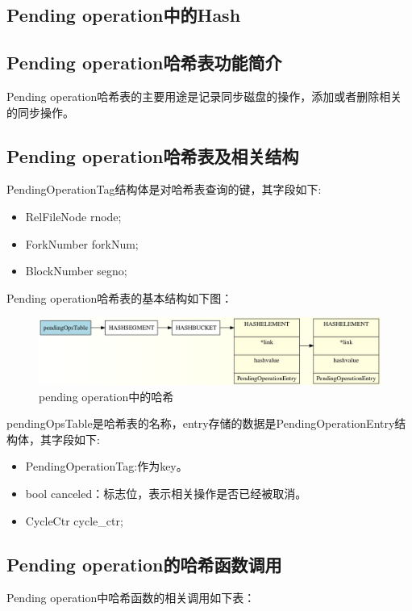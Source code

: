 \documentclass{article}
\begin{document}
\begin{CJK*}{UTF8}{gkai}
\section{Pending operation中的Hash} 

\subsection{Pending operation哈希表功能简介}
\indent Pending operation哈希表的主要用途是记录同步磁盘的操作，添加或者删除相关的同步操作。\\
\subsection{Pending operation哈希表及相关结构}
\indent PendingOperationTag结构体是对哈希表查询的键，其字段如下:

\begin{itemize}
\item \quad RelFileNode rnode;
\item \quad ForkNumber forkNum;
\item \quad BlockNumber  segno;
\end{itemize}

\indent Pending operation哈希表的基本结构如下图：

\begin{figure}[H] 
\centering
\includegraphics[width = \textwidth]{pending.jpg}
\caption{pending operation中的哈希}
\label{overflow}
\end{figure}
\indent pendingOpsTable是哈希表的名称，entry存储的数据是PendingOperationEntry结构体，其字段如下:
\begin{itemize}
\item \quad PendingOperationTag:作为key。
\item \quad bool canceled：标志位，表示相关操作是否已经被取消。
\item \quad CycleCtr cycle\_ctr;
\end{itemize}

\subsection{Pending operation的哈希函数调用}
\indent Pending operation中哈希函数的相关调用如下表：
\begin{table}[H] 
\scriptsize
\centering


\end{table}
\end{CJK*}
\end{document}
